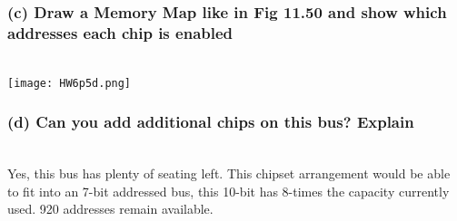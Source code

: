 \documentclass[a4paper,man,natbib]{apa6}
\begin{document}
\subsubsection{(c) Draw a Memory Map like in Fig 11.50 and show which addresses each chip is enabled }~\\
\texttt{[image: HW6p5d.png]}
\subsubsection{(d) Can you add additional chips on this bus? Explain }~\\
Yes, this bus has plenty of seating left. This chipset arrangement would be able to fit into an 7-bit addressed bus, this 10-bit has 8-times the capacity currently used. 920 addresses remain available.

\nocite{warford10}

\end{document}
